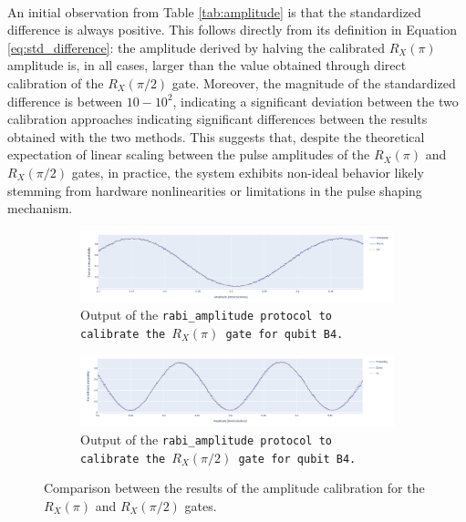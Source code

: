 \paragraph{}
An initial observation from Table \ref{tab:amplitude} is that the standardized difference is always positive. 
This follows directly from its definition in Equation \ref{eq:std_difference}: the amplitude derived by halving the calibrated $R_X(\pi)$ amplitude is, in all cases, larger than the value obtained through direct calibration of the $R_X(\pi/2)$ gate.
Moreover, the magnitude of the standardized difference is between $10-10^2$, indicating a significant deviation between the two calibration approaches indicating significant differences between the results obtained with the two methods. 
This suggests that, despite the theoretical expectation of linear scaling between the pulse amplitudes of the $R_X(\pi)$ and $R_X(\pi/2)$ gates, in practice, the system exhibits non-ideal behavior likely stemming from hardware nonlinearities or limitations in the pulse shaping mechanism.

\begin{figure}[h!]
    \centering
    \begin{subfigure}[t]{\textwidth}
        \includegraphics[width=\textwidth]{figures/png/RX90/RabiAmplitude/B4.png}
        \caption{Output of the \tt{rabi\_amplitude} protocol to calibrate the $R_X(\pi)$ gate for qubit \tt{B4}.}
        \label{fig:B4}
    \end{subfigure}
    \vspace{0.3cm}
    \begin{subfigure}[t]{\textwidth}
        \includegraphics[width=\textwidth]{figures/png/RX90/RabiAmplitude/B4_90.png}
        \caption{Output of the \tt{rabi\_amplitude} protocol to calibrate the $R_X(\pi/2)$ gate for qubit \tt{B4}.}
        \label{fig:B4_90}
    \end{subfigure}
    \caption{Comparison between the results of the amplitude calibration for the $R_X(\pi)$ and $R_X(\pi/2)$ gates.}
    \label{fig:amplitude_comparison}
\end{figure}

